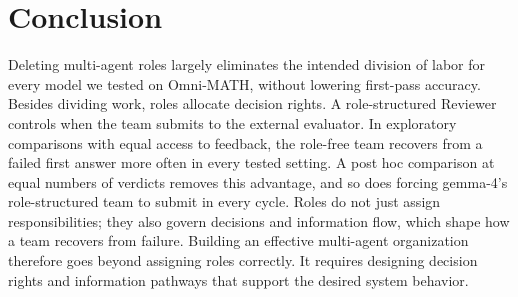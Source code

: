 \section{Conclusion}
\label{sec:conclusion}

Deleting multi-agent roles largely eliminates the intended division of
labor for every model we tested on Omni-MATH, without lowering first-pass
accuracy. Besides dividing work, roles allocate decision rights. A
role-structured Reviewer controls when the team submits to the external
evaluator. In exploratory comparisons with equal access to feedback, the
role-free team recovers from a failed first answer more often in every
tested setting. A post hoc comparison at equal numbers of verdicts removes
this advantage, and so does forcing gemma-4's role-structured team to
submit in every cycle. Roles do not just assign responsibilities; they also
govern decisions and information flow, which shape how a team recovers
from failure. Building an effective multi-agent organization therefore goes
beyond assigning roles correctly. It requires designing decision rights and
information pathways that support the desired system behavior.
